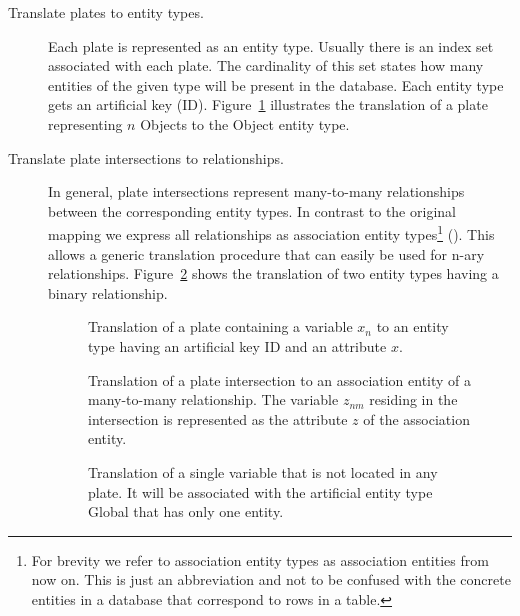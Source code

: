 \begin{description}
\item[Translate plates to entity types.] Each plate is represented as an entity type. Usually there is an index set associated with each plate. The cardinality of this set states how many entities of the given type will be present in the database. Each entity type gets an artificial key (ID). Figure~\ref{fig:pm2erm_uno_local} illustrates the translation of a plate representing $n$ Objects to the Object entity type.

\item[Translate plate intersections to relationships.] In general, plate intersections represent many-to-many relationships between the corresponding entity types. In contrast to the original mapping we express all relationships as association entity types\footnote{For brevity we refer to association entity types as association entities from now on. This is just an abbreviation and not to be confused with the concrete entities in a database that correspond to rows in a table.} (\cite[pp.~86-88]{elmasri2007database}). This allows a generic translation procedure that can easily be used for n-ary relationships. Figure~\ref{fig:pm2erm_bi_noconstraints} shows the translation of two entity types having a binary relationship.

\begin{figure}[h!]
\centering
\scalebox{\tikzScale}{\adjustTikzSize }
\caption[Translation of a plate containing a single variable to an ERM]{Translation of a plate containing a variable $x_n$ to an entity type having an artificial key ID and an attribute $x$.}\label{fig:pm2erm_uno_local}
\end{figure}

\begin{figure}[h!]
\centering
\scalebox{\tikzScale}{\adjustTikzSize }
\caption[Translation of a plate intersection to an ERM]{Translation of a plate intersection to an association entity of a many-to-many relationship. The variable $z_{nm}$ residing in the intersection is represented as the attribute $z$ of the association entity.}\label{fig:pm2erm_bi_noconstraints}
\end{figure}

\begin{figure}[h!]
\centering
\scalebox{\tikzScale}{\adjustTikzSize }
\caption[Translation of a variable associated with no plate to an ERM]{Translation of a single variable that is not located in any plate. It will be associated with the artificial entity type Global that has only one entity.}\label{fig:pm2erm_uno_global}
\end{figure}


\end{description}
